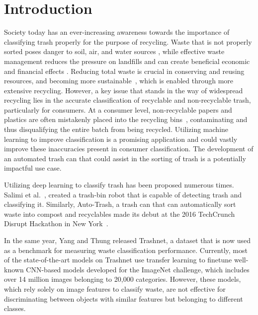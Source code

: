 \documentclass[conference]{ieeeconf}
\begin{document}
\section{Introduction}
Society today has an ever-increasing awareness towards the importance of classifying trash properly for the purpose of recycling. Waste that is not properly sorted poses danger to soil, air, and water sources \cite{Jain2017}, while effective waste management reduces the pressure on landfills and can create beneficial economic and financial effects \cite{Nizar2018}. Reducing total waste is crucial in conserving and reusing resources, and becoming more sustainable~\cite{Abkenari2015}, which is enabled through more extensive recycling. However, a key issue that stands in the way of widespread recycling lies in the accurate classification of recyclable and non-recyclable trash, particularly for consumers. At a consumer level, non-recyclable papers and plastics are often mistakenly placed into the recycling bins~\cite{Luo2019}, contaminating and thus disqualifying the entire batch from being recycled. Utilizing machine learning to improve classification is a promising application and could vastly improve these inaccuracies present in consumer classification. The development of an automated trash can that could assist in the sorting of trash is a potentially impactful use case. 

Utilizing deep learning to classify trash has been proposed numerous times. Salimi et al.~\cite{Salimi2018}, created a trash-bin robot that is capable of detecting trash and classifying it. Similarly, Auto-Trash, a trash can that can automatically sort waste into compost and recyclables made its debut at the 2016 TechCrunch Disrupt Hackathon in New York~\cite{AutoTrash}.

In the same year, Yang and Thung \cite{Yang2016} released Trashnet, a dataset that is now used as a benchmark for measuring waste classification performance. Currently, most of the state-of-the-art models on Trashnet use transfer learning to finetune well-known CNN-based models developed for the ImageNet challenge\cite{ImageNet}, which includes over 14 million images belonging to 20,000 categories. However, these models, which rely solely on image features to classify waste, are not effective for discriminating between objects with similar features but belonging to different classes. 
\end{document}

